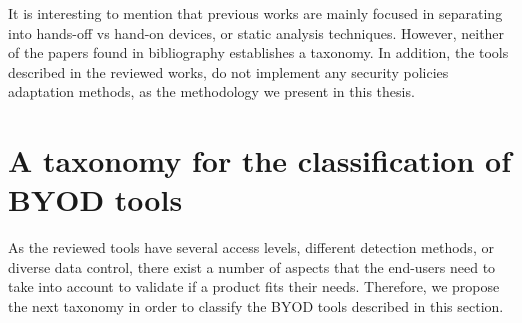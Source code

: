 It is interesting to mention that previous works are mainly focused in separating into hands-off vs hand-on devices, or static analysis techniques. However, neither of the papers found in bibliography establishes a taxonomy. In addition, the tools described in the reviewed works, do not implement any security policies adaptation methods, as the methodology we present in this thesis.

\section{A taxonomy for the classification of BYOD tools}
\label{sec:taxonomy}

As the reviewed tools have several access levels, different detection methods, or diverse data control, there exist a number of aspects that the end-users need to take into account to validate if a product fits their needs. Therefore, we propose the next taxonomy in order to classify the BYOD tools described in this section.

